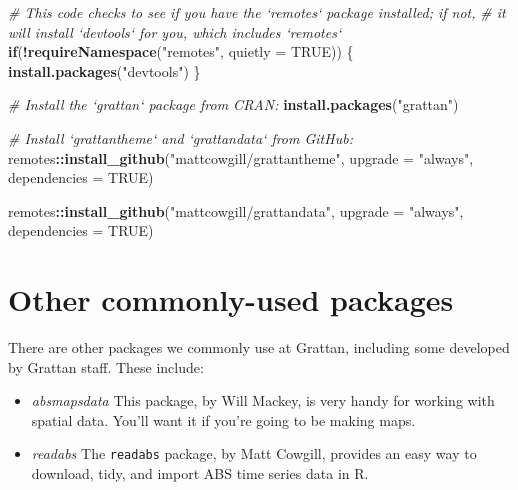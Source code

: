 \documentclass[]{book}
\newenvironment{Shaded}{\begin{snugshade}}{\end{snugshade}}
\newcommand{\CommentTok}[1]{\textcolor[rgb]{0.56,0.35,0.01}{\textit{#1}}}
\newcommand{\ControlFlowTok}[1]{\textcolor[rgb]{0.13,0.29,0.53}{\textbf{#1}}}
\newcommand{\DataTypeTok}[1]{\textcolor[rgb]{0.13,0.29,0.53}{#1}}
\newcommand{\KeywordTok}[1]{\textcolor[rgb]{0.13,0.29,0.53}{\textbf{#1}}}
\newcommand{\NormalTok}[1]{#1}
\newcommand{\OperatorTok}[1]{\textcolor[rgb]{0.81,0.36,0.00}{\textbf{#1}}}
\newcommand{\OtherTok}[1]{\textcolor[rgb]{0.56,0.35,0.01}{#1}}
\newcommand{\StringTok}[1]{\textcolor[rgb]{0.31,0.60,0.02}{#1}}
\begin{document}
\begin{Shaded}
\begin{Highlighting}[]
\CommentTok{# This code checks to see if you have the `remotes` package installed; if not,}
\CommentTok{# it will install `devtools` for you, which includes `remotes`}
\ControlFlowTok{if}\NormalTok{(}\OperatorTok{!}\KeywordTok{requireNamespace}\NormalTok{(}\StringTok{"remotes"}\NormalTok{, }\DataTypeTok{quietly =} \OtherTok{TRUE}\NormalTok{)) \{}
  \KeywordTok{install.packages}\NormalTok{(}\StringTok{"devtools"}\NormalTok{)}
\NormalTok{\}}

\CommentTok{# Install the `grattan` package from CRAN:}
\KeywordTok{install.packages}\NormalTok{(}\StringTok{"grattan"}\NormalTok{)}

\CommentTok{# Install `grattantheme` and `grattandata` from GitHub:}
\NormalTok{remotes}\OperatorTok{::}\KeywordTok{install_github}\NormalTok{(}\StringTok{"mattcowgill/grattantheme"}\NormalTok{,}
                        \DataTypeTok{upgrade =} \StringTok{"always"}\NormalTok{,}
                        \DataTypeTok{dependencies =} \OtherTok{TRUE}\NormalTok{)}

\NormalTok{remotes}\OperatorTok{::}\KeywordTok{install_github}\NormalTok{(}\StringTok{"mattcowgill/grattandata"}\NormalTok{,}
                        \DataTypeTok{upgrade =} \StringTok{"always"}\NormalTok{,}
                        \DataTypeTok{dependencies =} \OtherTok{TRUE}\NormalTok{)}
\end{Highlighting}
\end{Shaded}

\hypertarget{other-commonly-used-packages}{%
\section{Other commonly-used packages}\label{other-commonly-used-packages}}

There are other packages we commonly use at Grattan, including some developed by Grattan staff. These include:

\begin{itemize}
\item
  \emph{absmapsdata} This package, by Will Mackey, is very handy for working with spatial data. You'll want it if you're going to be making maps.
\item
  \emph{readabs} The \texttt{readabs} package, by Matt Cowgill, provides an easy way to download, tidy, and import ABS time series data in R.
\end{itemize}
\end{document}
